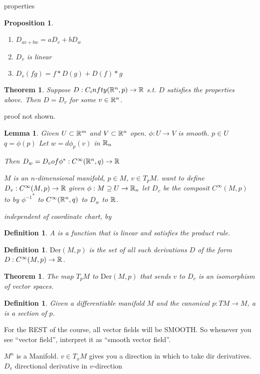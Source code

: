 \documentclass[11pt]{amsbook}
\newenvironment{dateenv}{
	\vspace{1em}
}{
	\vspace{1em}
}
\newcommand{\mydate}[4]{
	\newdate{#1}{#2}{#3}{#4}
	\begin{dateenv}
		\hfill\displaydate{#1}
	\end{dateenv}
}
\theoremstyle{mystyle} \newtheorem{thrm}[thm]{Theorem}
\theoremstyle{mystyle} \newtheorem{defi}[thm]{Definition}
\theoremstyle{mystyle} \newtheorem{coro}[thm]{Corollary}
\theoremstyle{mystyle} \newtheorem{propo}[thm]{Proposition}
\theoremstyle{mystyle} \newtheorem{lemm}[thm]{Lemma}
\numberwithin{thm}{section}
\newcommand{\Der}{\text{Der}}
\begin{document}
properties
\begin{propo}
	\begin{enumerate}
		\item $D_{av + bw} = aD_{v} + bD_{w}$
		\item $D_v$ is linear
		\item $D_v(fg) = f*D(g) + D(f)*g$
	\end{enumerate}
\end{propo}
\begin{thrm}
	Suppose $D : C_infty({\mathbb R}^n,p) \to {\mathbb R}$
	s.t. $D$ satisfies the properties above.  Then $D = D_v$ for some $v \in {\mathbb R}^n$.
\end{thrm}
proof not shown.
\begin{lemm}
	Given $U \subset {\mathbb R}^m$ and $V \subset {\mathbb R}^n$ open.
	$\phi : U \to V$ is smooth.
	$p \in U$
	$q = \phi(p)$
	Let
	$w = d \phi_p(v)$ in ${\mathbb R}_n$

	Then
	$D_w = D_v of \phi^* : C^\infty({\mathbb R}^n,q) \to {\mathbb R}$

	$M$ is an $n$-dimensional manifold, $p \in M$, $v \in T_pM$.
	want to define
	$D_v : C^\infty(M,p) \to {\mathbb R}$
	given $\phi: M \supseteq U \to {\mathbb R}_n$ let $D_v$ be the composit
	$C^\infty(M, p)$ to by ${\phi^{-1}}^*$ to $C^\infty({\mathbb R}^n,q)$ to $D_w$ to ${\mathbb R}$.

	independent of coordinate chart, by
\end{lemm}
\begin{defi}
	A  is a function that is linear and satisfies the product rule.
\end{defi}
\begin{defi}
	$\Der(M,p)$ is the set of all such derivations $D$ of the form $D: C^\infty(M,p) \to {\mathbb R}$.
\end{defi}
\begin{thrm}
	The map $T_pM$ to $\Der(M,p)$
	that sends $v$ to $D_v$
	is an isomorphism of vector spaces.
\end{thrm}

\mydate{d5}{10}{10}{2016}

\begin{defi}
	Given a differentiable manifold $M$ and the canonical $p: TM \to M$, a  is a section of $p$.
\end{defi}
\begin{rmk}
	For the REST of the course, all vector fields will be SMOOTH.  So whenever you see ``vector field'', interpret it as ``smooth vector field''.
\end{rmk}

$M^n$ is a Manifold.
$v \in T_xM$ gives you a direction in which to take dir derivatives.
$D_v$ directional derivative in $v$-direction
\end{document}
